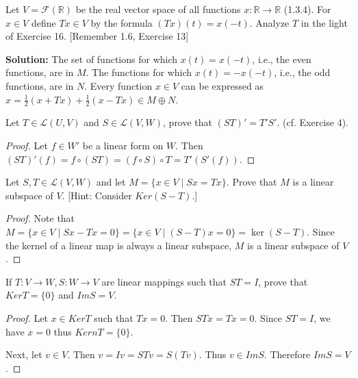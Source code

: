 \begin{tcolorbox}[title=Problem 17, breakable]
    Let $V = \mathcal{F}(\mathbb{R})$ be the real vector space of all functions $x : \mathbb{R} \longrightarrow \mathbb{R}$ (1.3.4).
    For $x \in V$ define $Tx \in V$ by the formula $(Tx)(t) = x(-t)$. Analyze $T$ in the light of Exercise 16.
    [Remember 1.6, Exercise 13]
\end{tcolorbox}

\textbf{Solution: } The set of functions for which $x(t) = x(-t)$, i.e., the even functions, are in $M$. 
The functions for which $x(t) = -x(-t)$, i.e., the odd functions, are in $N$. 
Every function $x \in V$ can be expressed as $x = \frac{1}{2}(x + Tx) + \frac{1}{2}(x - Tx) \in M \oplus N$.

\begin{tcolorbox}[title=Problem 18, breakable]
    Let $T \in \mathcal{L}(U, V)$ and $S \in \mathcal{L}(V, W)$,
        prove that $(ST)' = T'S'$.
    (cf. Exercise 4).
\end{tcolorbox}

\begin{proof}
    Let $f \in W'$ be a linear form on $W$.  
    Then $(ST)'(f) = f \circ (ST) = (f \circ S) \circ T = T'(S'(f))$.
\end{proof}

\begin{tcolorbox}[title=Problem 19, breakable]
    Let $S, T \in \mathcal{L}(V, W)$ and let $M = \{x \in V \mid Sx = Tx\}$.
    Prove that $M$ is a linear subspace of $V$. [Hint: Consider $Ker(S - T)$.]
\end{tcolorbox}

\begin{proof}
    Note that $M = \{x \in V \mid Sx - Tx = 0\} = \{x \in V \mid (S - T)x = 0\} = \ker(S - T)$.
    Since the kernel of a linear map is always a linear subspace, $M$ is a linear subspace of $V$.
\end{proof}

\begin{tcolorbox}[title=Problem 20, breakable]
    If $T : V \longrightarrow W, S : W \longrightarrow V$ are linear mappings
        such that $ST = I$, prove that $Ker T = \{0\}$ and $Im S = V$.
\end{tcolorbox}

\begin{proof}
    Let $x \in Ker T$ such that $Tx = 0$.
    Then $STx = Tx = 0$.
    Since $ST = I$, we have $x = 0$ thus $Kern T = \{0\}$.

    Next, let $v \in V$. Then $v = Iv = STv = S(Tv)$.
    Thus $v \in Im S$. Therefore $Im S = V$.
\end{proof} 

